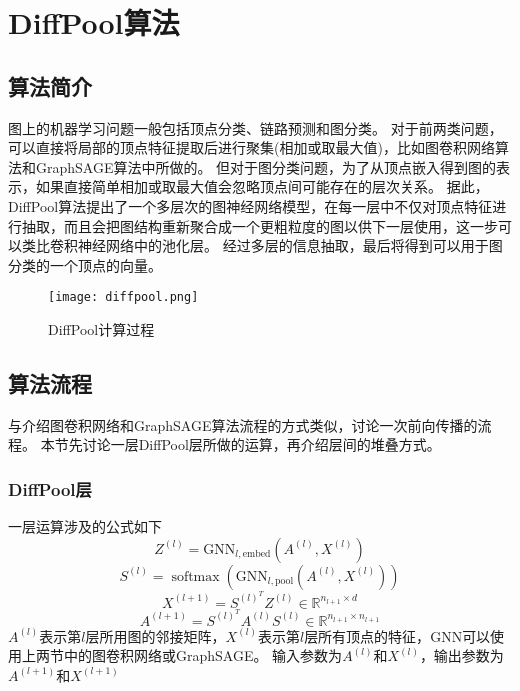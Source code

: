 \section{DiffPool算法}

\subsection{算法简介}
图上的机器学习问题一般包括顶点分类、链路预测和图分类。
对于前两类问题，可以直接将局部的顶点特征提取后进行聚集(相加或取最大值)，比如图卷积网络算法和GraphSAGE算法中所做的。
但对于图分类问题，为了从顶点嵌入得到图的表示，如果直接简单相加或取最大值会忽略顶点间可能存在的层次关系。
据此，DiffPool算法提出了一个多层次的图神经网络模型，在每一层中不仅对顶点特征进行抽取，而且会把图结构重新聚合成一个更粗粒度的图以供下一层使用，这一步可以类比卷积神经网络中的池化层。
经过多层的信息抽取，最后将得到可以用于图分类的一个顶点的向量。

\begin{figure}[htb]
    \centering
    \texttt{[image: diffpool.png]}
    \caption{DiffPool计算过程}
\end{figure}

\subsection{算法流程}
与介绍图卷积网络和GraphSAGE算法流程的方式类似，讨论一次前向传播的流程。
本节先讨论一层DiffPool层所做的运算，再介绍层间的堆叠方式。

\subsubsection{DiffPool层}
\begin{definition}
    一层运算涉及的公式如下
    \begin{equation}
        Z^{(l)}=\mathrm{GNN}_{l, \mathrm{embed}}\left(A^{(l)}, X^{(l)}\right) 
    \end{equation}
    \begin{equation}
        S^{(l)}=\operatorname{softmax}\left(\mathrm{GNN}_{l, \mathrm{pool}}\left(A^{(l)}, X^{(l)}\right)\right)
    \end{equation}
    \begin{equation}
        X^{(l+1)} =S^{(l)^{T}} Z^{(l)} \in \mathbb{R}^{n_{l+1} \times d}
    \end{equation}
    \begin{equation}
        A^{(l+1)} =S^{(l)^{T}} A^{(l)} S^{(l)} \in \mathbb{R}^{n_{l+1} \times n_{l+1}}
    \end{equation}
    $A^{(l)}$表示第$l$层所用图的邻接矩阵，$X^{(l)}$表示第$l$层所有顶点的特征，$\mathrm{GNN}$可以使用上两节中的图卷积网络或GraphSAGE。
    输入参数为$A^{(l)}$和$X^{(l)}$，输出参数为$A^{(l+1)}$和$X^{(l+1)}$
\end{definition}

